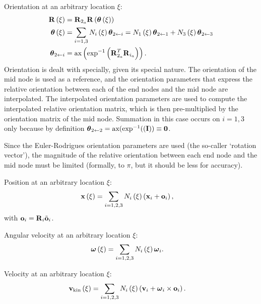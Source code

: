 Orientation at an arbitrary location $\xi$:
\begin{align}
	\bm{\mathbf{R}}\left( \xi \right)
	&=
	\bm{\mathbf{R}}_{2_a} \bm{\mathbf{R}}\left( \bm{\mathbf{\theta}}\left( \xi \right) \right)
	\\
	\bm{\mathbf{\theta}}\left( \xi \right)
	&=
	\sum_{i=1,3} N_i\left( \xi \right) \bm{\mathbf{\theta}}_{2\leftarrow i}
	= N_1\left( \xi \right) \bm{\mathbf{\theta}}_{2\leftarrow 1} + N_3\left( \xi \right) \bm{\mathbf{\theta}}_{2\leftarrow 3}
	\\
	\bm{\mathbf{\theta}}_{2\leftarrow i}
	&=
	\text{ax}\left( \text{exp}^{-1}\left( \bm{\mathbf{R}}_{2_a}^T \bm{\mathbf{R}}_{i_a} \right) \right)
	.
\end{align}
Orientation is dealt with specially, given its special nature.
The orientation of the mid node is used as a reference,
and the orientation parameters that express the relative orientation
between each of the end nodes and the mid node are interpolated.
The interpolated orientation parameters are used to compute
the interpolated relative orientation matrix, which is then
pre-multiplied by the orientation matrix of the mid node.
Summation in this case occurs on $i=1,3$ only because by definition
$\bm{\mathbf{\theta}}_{2\leftarrow 2}=\text{ax}(\text{exp}^{-1}((\bm{\mathbf{I}}))\equiv\bm{\mathbf{0}}$.

Since the Euler-Rodrigues orientation parameters are used
(the so-caller `rotation vector'),
the magnitude of the relative orientation between each end node
and the mid node must be limited (formally, to $\pi$,
but it should be less for accuracy).

Position at an arbitrary location $\xi$:
\begin{align}
	\bm{\mathbf{x}}\left( \xi \right)
	&=
	\sum_{i=1,2,3} N_i\left( \xi \right) \left( 
		\bm{\mathbf{x}}_i + \bm{\mathbf{o}}_i
	 \right)
	,
\end{align}
with $\bm{\mathbf{o}}_i=\bm{\mathbf{R}}_i \tilde{\bm{\mathbf{o}}}_i$.

Angular velocity at an arbitrary location $\xi$:
\begin{align}
	\bm{\mathbf{\omega}}\left( \xi \right)
	&=
	\sum_{i=1,2,3} N_i\left( \xi \right) \bm{\mathbf{\omega}}_i
	.
\end{align}

Velocity at an arbitrary location $\xi$:
\begin{align}
	\bm{\mathbf{v}}_{\text{kin}}\left( \xi \right)
	&=
	\sum_{i=1,2,3} N_i\left( \xi \right) \left( 
		\bm{\mathbf{v}}_i
		+ \bm{\mathbf{\omega}}_i \times \bm{\mathbf{o}}_i
	 \right)
	.
\end{align}

